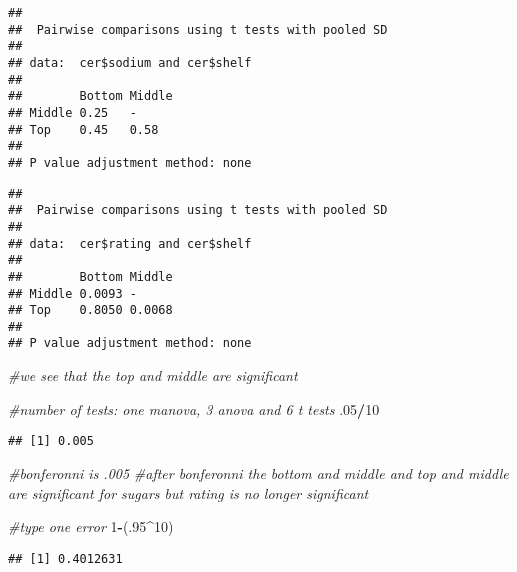 \documentclass[]{article}
\newenvironment{Shaded}{\begin{snugshade}}{\end{snugshade}}
\newcommand{\CommentTok}[1]{\textcolor[rgb]{0.56,0.35,0.01}{\textit{#1}}}
\newcommand{\DataTypeTok}[1]{\textcolor[rgb]{0.13,0.29,0.53}{#1}}
\newcommand{\DecValTok}[1]{\textcolor[rgb]{0.00,0.00,0.81}{#1}}
\newcommand{\FloatTok}[1]{\textcolor[rgb]{0.00,0.00,0.81}{#1}}
\newcommand{\KeywordTok}[1]{\textcolor[rgb]{0.13,0.29,0.53}{\textbf{#1}}}
\newcommand{\NormalTok}[1]{#1}
\newcommand{\OperatorTok}[1]{\textcolor[rgb]{0.81,0.36,0.00}{\textbf{#1}}}
\newcommand{\StringTok}[1]{\textcolor[rgb]{0.31,0.60,0.02}{#1}}
\begin{document}
\begin{verbatim}
## 
##  Pairwise comparisons using t tests with pooled SD 
## 
## data:  cer$sodium and cer$shelf 
## 
##        Bottom Middle
## Middle 0.25   -     
## Top    0.45   0.58  
## 
## P value adjustment method: none
\end{verbatim}

\begin{Shaded}
\end{Shaded}

\begin{verbatim}
## 
##  Pairwise comparisons using t tests with pooled SD 
## 
## data:  cer$rating and cer$shelf 
## 
##        Bottom Middle
## Middle 0.0093 -     
## Top    0.8050 0.0068
## 
## P value adjustment method: none
\end{verbatim}

\begin{Shaded}
\begin{Highlighting}[]
\CommentTok{#we see that the top and middle are significant}

\CommentTok{#number of tests: one manova, 3 anova and 6 t tests}
\FloatTok{.05}\OperatorTok{/}\DecValTok{10}
\end{Highlighting}
\end{Shaded}

\begin{verbatim}
## [1] 0.005
\end{verbatim}

\begin{Shaded}
\begin{Highlighting}[]
\CommentTok{#bonferonni is .005}
\CommentTok{#after bonferonni the bottom and middle and top and middle are significant for sugars but rating is no longer significant}

\CommentTok{#type one error}
\DecValTok{1}\OperatorTok{-}\NormalTok{(.}\DecValTok{95}\OperatorTok{^}\DecValTok{10}\NormalTok{)}
\end{Highlighting}
\end{Shaded}

\begin{verbatim}
## [1] 0.4012631
\end{verbatim}
\end{document}

